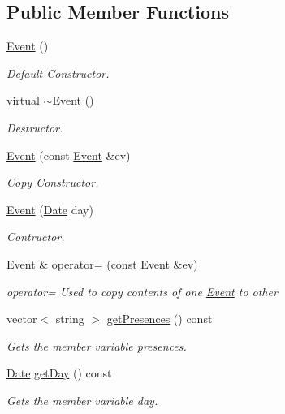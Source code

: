 \subsection*{Public Member Functions}
\begin{DoxyCompactItemize}
\item 
\hyperlink{class_event_a5a40dd4708297f7031e29b39e039ae10}{Event} ()
\begin{DoxyCompactList}\small\item\em Default Constructor. \end{DoxyCompactList}\item 
virtual \hyperlink{class_event_ab864fd85c758006c42cd7a1b3369b483}{$\sim$\+Event} ()
\begin{DoxyCompactList}\small\item\em Destructor. \end{DoxyCompactList}\item 
\hyperlink{class_event_aa79f43b0c42280875280ec071aa2eea1}{Event} (const \hyperlink{class_event}{Event} \&ev)
\begin{DoxyCompactList}\small\item\em Copy Constructor. \end{DoxyCompactList}\item 
\hyperlink{class_event_ad13c7b9652c4e3ab546d86406097d23a}{Event} (\hyperlink{class_date}{Date} day)
\begin{DoxyCompactList}\small\item\em Contructor. \end{DoxyCompactList}\item 
\hyperlink{class_event}{Event} \& \hyperlink{class_event_a8115e592203a26166924dcae5b064e06}{operator=} (const \hyperlink{class_event}{Event} \&ev)
\begin{DoxyCompactList}\small\item\em operator= Used to copy contents of one \hyperlink{class_event}{Event} to other \end{DoxyCompactList}\item 
vector$<$ string $>$ \hyperlink{class_event_a67677233149ff7e2ebe038d3cfa35223}{get\+Presences} () const
\begin{DoxyCompactList}\small\item\em Gets the member variable presences. \end{DoxyCompactList}\item 
\hyperlink{class_date}{Date} \hyperlink{class_event_a9c016f59ee7116b2397a4823911e1a65}{get\+Day} () const
\begin{DoxyCompactList}\small\item\em Gets the member variable day. \end{DoxyCompactList}\item 

\end{DoxyCompactItemize}
